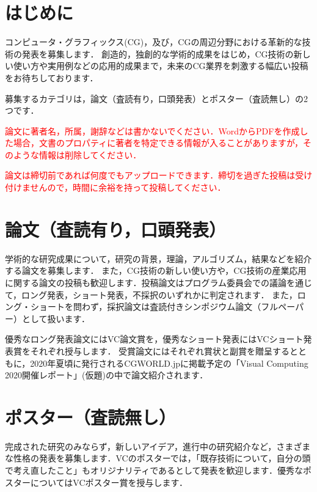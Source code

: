 \documentclass{jarticle}
\newcommand{\red}[1]{\textcolor{red}{#1}}
\begin{document}

\section{はじめに}
コンピュータ・グラフィックス(CG)，及び，CGの周辺分野における革新的な技術の発表を募集します．
創造的，独創的な学術的成果をはじめ，CG技術の新しい使い方や実用例などの応用的成果まで，未来のCG業界を刺激する幅広い投稿をお待ちしております．

募集するカテゴリは，論文（査読有り，口頭発表）とポスター（査読無し）の2つです．

\red{論文に著者名，所属，謝辞などは書かないでください．WordからPDFを作成した場合，文書のプロパティに著者を特定できる情報が入ることがありますが，そのような情報は削除してください．}

\red{論文は締切前であれば何度でもアップロードできます．締切を過ぎた投稿は受け付けませんので，時間に余裕を持って投稿してください．}


\section{論文（査読有り，口頭発表）}
学術的な研究成果について，研究の背景，理論，アルゴリズム，結果などを紹介する論文を募集します． また，CG技術の新しい使い方や，CG技術の産業応用に関する論文の投稿も歓迎します．投稿論文はプログラム委員会での議論を通じて，ロング発表，ショート発表，不採択のいずれかに判定されます．
また，ロング・ショートを問わず，採択論文は査読付きシンポジウム論文（フルペーパー）として扱います．

優秀なロング発表論文にはVC論文賞を，優秀なショート発表にはVCショート発表賞をそれぞれ授与します． 受賞論文にはそれぞれ賞状と副賞を贈呈するとともに，2020年夏頃に発行されるCGWORLD.jpに掲載予定の「Visual Computing 2020開催レポート」(仮題)の中で論文紹介されます．

\section{ポスター（査読無し）}
完成された研究のみならず，新しいアイデア，進行中の研究紹介など，さまざまな性格の発表を募集します．VCのポスターでは，「既存技術について，自分の頭で考え直したこと」もオリジナリティであるとして発表を歓迎します．優秀なポスターについてはVCポスター賞を授与します．

\small

\nocite{*}

\end{document}
